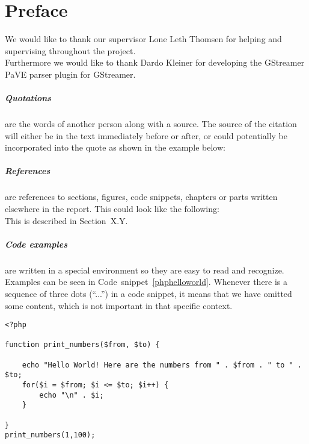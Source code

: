 \chapter*{Preface}
\label{preface}
We would like to thank our supervisor Lone Leth Thomsen for helping and supervising throughout the project.\\
Furthermore we would like to thank Dardo Kleiner for developing the GStreamer PaVE parser plugin for GStreamer.


\paragraph{Quotations} are the words of another person along with a source.
The source of the citation will either be in the text immediately before or after, or could potentially be incorporated into the quote as shown in the example below: \\


\paragraph{References} are references to sections, figures, code snippets, chapters or parts written elsewhere in the report.
This could look like the following:\\

This is described in Section~X.Y.

\paragraph{Code examples} are written in a special environment so they are easy to read and recognize.
Examples can be seen in Code~snippet~\ref{phphelloworld}.
Whenever there is a sequence of three dots (``...'') in a code snippet, it means that we have omitted some content, which is not important in that specific context.

\begin{lstlisting}[style=sourceCode, caption={Code example of a hello world script written in PHP.}, label=phphelloworld]
<?php

function print_numbers($from, $to) {
    
    echo "Hello World! Here are the numbers from " . $from . " to " . $to;
    for($i = $from; $i <= $to; $i++) {
        echo "\n" . $i;
    }
    
}
print_numbers(1,100);

\end{lstlisting}